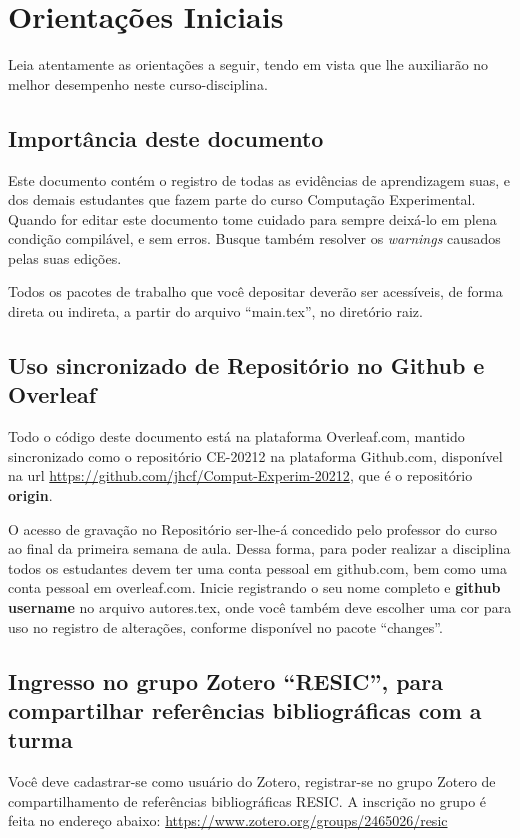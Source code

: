 \chapter{Orientações Iniciais}

Leia atentamente as orientações a seguir, tendo em vista que lhe auxiliarão no melhor desempenho neste curso-disciplina. 

\section{Importância deste documento}

Este documento contém o registro de todas as evidências de aprendizagem suas, e dos demais estudantes que fazem parte do curso Computação Experimental.
Quando for editar este documento tome cuidado para sempre deixá-lo em plena condição compilável, e sem erros. Busque também resolver os \textit{warnings} causados pelas suas edições.

Todos os pacotes de trabalho que você depositar deverão ser acessíveis, de forma direta ou indireta, a partir do arquivo ``main.tex'', no diretório raiz.

\section{Uso sincronizado de Repositório no Github e Overleaf}

Todo o código deste documento está na plataforma Overleaf.com, mantido sincronizado como o repositório CE-20212 na plataforma Github.com, disponível na url \url{https://github.com/jhcf/Comput-Experim-20212}, que é o repositório \textbf{origin}.


O acesso de gravação no Repositório ser-lhe-á concedido pelo professor do curso ao final da primeira semana de aula.
Dessa forma, para poder realizar a disciplina todos os estudantes devem ter uma conta pessoal em github.com, bem como uma conta pessoal em overleaf.com. Inicie registrando o seu nome completo e \textbf{github username} no arquivo autores.tex, onde você também deve escolher uma cor para uso no registro de alterações, conforme disponível no pacote ``changes''.

\section{Ingresso no grupo Zotero ``RESIC'', para  compartilhar referências bibliográficas com a turma}

Você deve cadastrar-se como usuário do Zotero, registrar-se no grupo Zotero de compartilhamento de referências bibliográficas RESIC.
A inscrição no grupo é feita no endereço abaixo:
\url{https://www.zotero.org/groups/2465026/resic}

